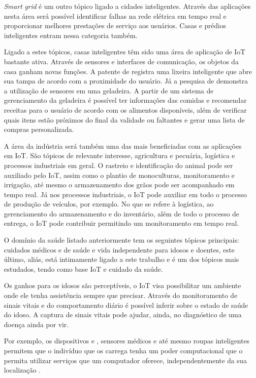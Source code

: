 \textit{Smart grid} é um outro tópico ligado a cidades inteligentes. Através
das aplicações nesta área será possível identificar falhas na rede elétrica em 
tempo real e proporcionar melhores prestações de serviço aos usuários. Casas
e prédios inteligentes entram nessa categoria também.

Ligado a estes tópicos, casas inteligentes têm sido uma área de aplicação de
IoT bastante ativa. Através de sensores e interfaces de comunicação, os objetos
da casa ganham novas funções. A patente de  registra
uma lixeira inteligente que abre sua tampa de acordo com a proximidade do
usuário. Já a pesquisa de  demonstra a utilização de
sensores em uma geladeira. A partir de um sistema de gerenciamento da geladeira
é possível ter informações das comidas e recomendar receitas para o usuário de
acordo com os alimentos disponíveis, além de verificar quais itens estão
próximos do final da validade ou faltantes e gerar uma lista de compras
personalizada.

A área da indústria será também uma das mais beneficiadas com as aplicações em IoT.
São tópicos de relevante interesse, agricultura e pecuária, logística e 
processos industriais em geral. O rastreio e identificação do animal pode ser
auxiliado pelo IoT, assim como o plantio de monoculturas, monitoramento e 
irrigação, até mesmo o armazenamento dos grãos pode ser acompanhado em tempo
real. Já nos processos industriais, o IoT pode auxiliar em todo o processo
de produção de veículos, por exemplo. No que se refere à logística, ao gerenciamento
do armazenamento e do inventário, além de todo o processo de entrega, o IoT pode
contribuir permitindo um monitoramento em tempo real.

O domínio da saúde listado anteriormente tem os seguintes tópicos principais:
cuidados médicos e de saúde e vida independente para idosos e doentes, este último, aliás,
está intimamente ligado a este trabalho e é um dos tópicos mais estudados, tendo
como base IoT e cuidado da saúde.

Os ganhos para os idosos são perceptíveis, o IoT visa possibilitar um ambiente
onde ele tenha assistência sempre que precisar. Através do monitoramento de 
sinais vitais e do comportamento diário é possível inferir sobre o estado 
de saúde do idoso. A captura de sinais vitais pode ajudar, ainda, no diagnóstico
de uma doença ainda por vir.

Por exemplo, os dispositivos \smartphones e \smartwatches, sensores médicos e até 
mesmo roupas inteligentes permitem que o indivíduo que os carrega tenha um poder 
computacional que o permita utilizar serviços que um computador oferece, 
independentemente da sua localização \cite{de2003computaccao}.

